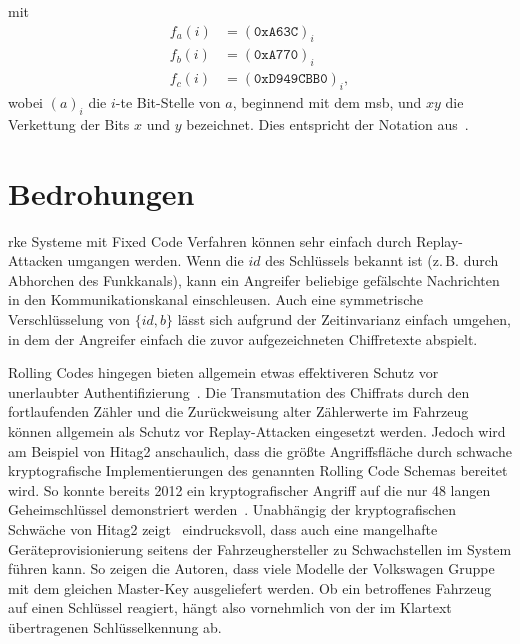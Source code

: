 %
mit
%
\begin{align*}
    f_{a}(i) & = {(\mathtt{0xA63C})}_{i}         \\
    f_{b}(i) & = {(\mathtt{0xA770})}_{i}         \\
    f_{c}(i) & = {(\mathtt{0xD949CBB0})}_{i} {,}
\end{align*}
%
wobei \({(a)}_{i}\) die \(i\)-te Bit-Stelle von \(a\), beginnend mit dem \gls{msb}, und \(x y\) die Verkettung der Bits \(x\) und \(y\) bezeichnet. Dies entspricht der Notation aus~\cite{Garcia2016,Verdult2015}.

\section{Bedrohungen}

\Gls{rke} Systeme mit \foreignlanguage{english}{Fixed Code} Verfahren können sehr einfach durch \foreignlanguage{english}{Replay}-Attacken umgangen werden. Wenn die \(\mathit{id}\) des Schlüssels bekannt ist (z.\,B. durch Abhorchen des Funkkanals), kann ein Angreifer beliebige gefälschte Nachrichten in den Kommunikationskanal einschleusen. Auch eine symmetrische Verschlüsselung von \( \{ \mathit{id}, b \} \) lässt sich aufgrund der Zeitinvarianz einfach umgehen, in dem der Angreifer einfach die zuvor aufgezeichneten Chiffretexte abspielt.

\foreignlanguage{english}{Rolling Codes} hingegen bieten allgemein etwas effektiveren Schutz vor unerlaubter Authentifizierung~\cite{Garcia2016}. Die Transmutation des Chiffrats durch den fortlaufenden Zähler und die Zurückweisung alter Zählerwerte im Fahrzeug können allgemein als Schutz vor \foreignlanguage{english}{Replay}-Attacken eingesetzt werden. Jedoch wird am Beispiel von Hitag2 anschaulich, dass die größte Angriffsfläche durch schwache kryptografische Implementierungen des genannten \foreignlanguage{english}{Rolling Code} Schemas bereitet wird. So konnte bereits 2012 ein kryptografischer Angriff auf die nur \SI{48}{\bit} langen Geheimschlüssel demonstriert werden~\cite{Verdult2012,Verdult2015}. Unabhängig der kryptografischen Schwäche von Hitag2 zeigt~\cite{Garcia2016} eindrucksvoll, dass auch eine mangelhafte Geräteprovisionierung seitens der Fahrzeughersteller zu Schwachstellen im System führen kann. So zeigen die Autoren, dass viele Modelle der Volkswagen Gruppe mit dem gleichen Master-Key ausgeliefert werden. Ob ein betroffenes Fahrzeug auf einen Schlüssel reagiert, hängt also vornehmlich von der im Klartext übertragenen Schlüsselkennung ab.
